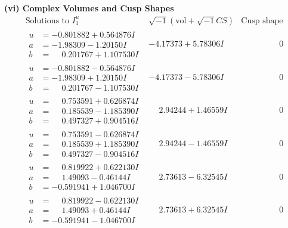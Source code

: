 \documentclass[1p]{elsarticle_modified}
\theoremstyle{definition}
\newcommand{\I}{\sqrt{-1}}
\begin{document}
\newpage\flushleft \textbf{(vi) Complex Volumes and Cusp Shapes}
$$\begin{array}{c|c|c}  
\text{Solutions to }I^u_{1}& \I (\text{vol} + \sqrt{-1}CS) & \text{Cusp shape}\\
 \hline 
\begin{aligned}
u &= -0.801882 + 0.564876 I \\
a &= -1.98309 - 1.20150 I \\
b &= \phantom{-}0.201767 + 1.107530 I\end{aligned}
 & -4.17373 + 5.78306 I & \phantom{-0.000000 } 0 \\ \hline\begin{aligned}
u &= -0.801882 - 0.564876 I \\
a &= -1.98309 + 1.20150 I \\
b &= \phantom{-}0.201767 - 1.107530 I\end{aligned}
 & -4.17373 - 5.78306 I & \phantom{-0.000000 } 0 \\ \hline\begin{aligned}
u &= \phantom{-}0.753591 + 0.626874 I \\
a &= \phantom{-}0.185539 - 1.185390 I \\
b &= \phantom{-}0.497327 + 0.904516 I\end{aligned}
 & \phantom{-}2.94244 + 1.46559 I & \phantom{-0.000000 } 0 \\ \hline\begin{aligned}
u &= \phantom{-}0.753591 - 0.626874 I \\
a &= \phantom{-}0.185539 + 1.185390 I \\
b &= \phantom{-}0.497327 - 0.904516 I\end{aligned}
 & \phantom{-}2.94244 - 1.46559 I & \phantom{-0.000000 } 0 \\ \hline\begin{aligned}
u &= \phantom{-}0.819922 + 0.622130 I \\
a &= \phantom{-}1.49093 - 0.46144 I \\
b &= -0.591941 + 1.046700 I\end{aligned}
 & \phantom{-}2.73613 - 6.32545 I & \phantom{-0.000000 } 0 \\ \hline\begin{aligned}
u &= \phantom{-}0.819922 - 0.622130 I \\
a &= \phantom{-}1.49093 + 0.46144 I \\
b &= -0.591941 - 1.046700 I\end{aligned}
 & \phantom{-}2.73613 + 6.32545 I & \phantom{-0.000000 } 0 \\ \hline\begin{aligned}

\end{aligned}
\end{array}$$
\end{document}
